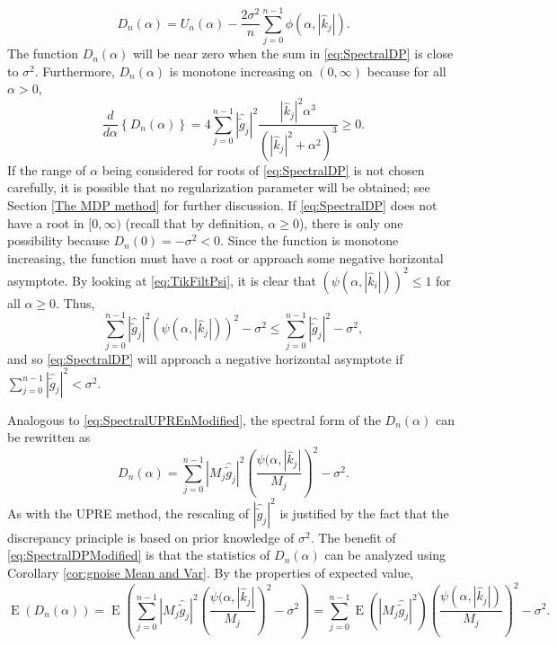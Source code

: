 \documentclass[12pt]{article}
\newcommand{\gnoise}{\widetilde{g}}	%
\newcommand{\regparam}{\alpha}
\newcommand{\filt}{\phi}
\newcommand{\mfilt}{\psi}
\newcommand{\noiseSD}{\sigma}	%
\DeclareMathOperator{\E}{E}	%
\newcommand{\U}{U}	%
\newcommand{\D}{D}	%
\begin{document}
\begin{equation}
\label{eq:UPRE DP Comp}
\D_n(\regparam) = \U_n(\regparam) - \frac{2\noiseSD^2}{n}\sum_{j = 0}^{n-1} \filt(\regparam,|\widehat{k}_j|).
\end{equation}
The function $\D_n(\regparam)$ will be near zero when the sum in \eqref{eq:SpectralDP} is close to $\noiseSD^2$.  Furthermore, $\D_n(\regparam)$ is monotone increasing on $(0,\infty)$ because for all $\regparam > 0$,
\[\frac{d}{d\regparam}\left\{\D_n(\regparam)\right\} = 4\sum_{j = 0}^{n-1} |\widehat{\gnoise}_j|^2\frac{|\widehat{k}_j|^2\regparam^3}{\left(|\widehat{k}_j|^2 + \regparam^2\right)^3} \geq 0.\]
If the range of $\regparam$ being considered for roots of \eqref{eq:SpectralDP} is not chosen carefully, it is possible that no regularization parameter will be obtained; see Section \ref{The MDP method} for further discussion. If \eqref{eq:SpectralDP} does not have a root in $[0,\infty)$ (recall that by definition, $\regparam \geq 0$), there is only one possibility because $\D_n(0) = -\noiseSD^2 < 0$. Since the function is monotone increasing, the function must have a root or approach some negative horizontal asymptote. By looking at \eqref{eq:TikFiltPsi}, it is clear that $(\mfilt(\regparam,|\widehat{k}_i|))^2 \leq 1$ for all $\regparam \geq 0$. Thus,
\[\sum_{j = 0}^{n-1} |\widehat{\gnoise}_j|^2(\mfilt(\regparam,|\widehat{k}_j|))^2 - \noiseSD^2 \leq \sum_{j = 0}^{n-1} |\widehat{\gnoise}_j|^2 - \noiseSD^2,\]
and so \eqref{eq:SpectralDP} will approach a negative horizontal asymptote if $\sum_{j = 0}^{n-1} |\widehat{\gnoise}_j|^2 < \noiseSD^2$. \par
Analogous to \eqref{eq:SpectralUPREnModified}, the spectral form of the $\D_n(\regparam)$ can be rewritten as
\begin{equation}
\label{eq:SpectralDPModified}
\D_n(\regparam) = \sum_{j = 0}^{n-1} |M_j\widehat{\gnoise}_j|^2\left(\frac{\mfilt(\regparam,|\widehat{k}_j|}{M_j}\right)^2 - \noiseSD^2.
\end{equation}
As with the UPRE method, the rescaling of $|\widehat{\gnoise}_j|^2$ is justified by the fact that the discrepancy principle is based on prior knowledge of $\noiseSD^2$. The benefit of \eqref{eq:SpectralDPModified} is that the statistics of $\D_n(\regparam)$ can be analyzed using Corollary \ref{cor:gnoise Mean and Var}. By the properties of expected value,
\[\E(\D_n(\regparam)) = \E\left(\sum_{j = 0}^{n-1} |M_j\widehat{\gnoise}_j|^2\left(\frac{\mfilt(\regparam,|\widehat{k}_j|}{M_j}\right)^2 - \noiseSD^2\right) = \sum_{j = 0}^{n-1} \E\left(|M_j\widehat{\gnoise}_j|^2\right)\left(\frac{\mfilt(\regparam,|\widehat{k}_j|)}{M_j}\right)^2 - \noiseSD^2.\]
\end{document}
